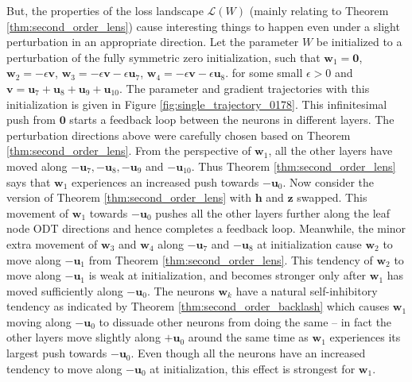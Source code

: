 \documentclass{article}
\theoremstyle{plain}
\theoremstyle{definition}
\theoremstyle{remark}
\newcommand{\1}{{\mathbf 1}}
\newcommand{\0}{{\mathbf 0}}
\newcommand{\h}{{\mathbf h}}
\newcommand{\z}{{\mathbf z}}
\newcommand{\w}{{\mathbf w}}
\newcommand{\bu}{{\mathbf u}}
\newcommand{\bv}{{\mathbf v}}
\renewcommand{\>}{{\rightarrow}}
\begin{document}
But, the properties of the loss landscape $\mathcal{L}(W)$ (mainly relating to Theorem \ref{thm:second_order_lens}) cause interesting things to happen even under a slight perturbation in an appropriate direction. Let the parameter $W$ be initialized to a perturbation of the fully symmetric zero initialization, such that
$\w_1 = \0$, 
$\w_2 =  - \epsilon \bv $,
$\w_3 =  - \epsilon \bv -\epsilon \bu_7$,
$\w_4 =  - \epsilon \bv -\epsilon \bu_8$. 
for some small $\epsilon>0$ and $\bv = \bu_7+\bu_8+\bu_9+\bu_{10}$. The parameter and gradient trajectories with this initialization is given in Figure \ref{fig:single_trajectory_0178}. This infinitesimal push from $\0$ starts a feedback loop between the neurons in different layers. The perturbation directions above were carefully chosen based on Theorem \ref{thm:second_order_lens}. From the perspective of $\w_1$, all the other layers have moved along $-\bu_7, -\bu_8, -\bu_9$ and $-\bu_{10}$. Thus Theorem \ref{thm:second_order_lens} says that $\w_1$ experiences an increased push towards $-\bu_0$. Now consider the version of Theorem \ref{thm:second_order_lens} with $\h$ and $\z$ swapped.  This movement of $\w_1$ towards $-\bu_0$ pushes all the other layers further along the leaf node ODT directions and hence completes a feedback loop. Meanwhile, the minor extra movement of $\w_3$ and $\w_4$ along $-\bu_7$ and $-\bu_8$ at initialization cause $\w_2$ to move along $-\bu_1$ from Theorem \ref{thm:second_order_lens}. This tendency of $\w_2$ to move along $-\bu_1$ is weak at initialization, and becomes stronger only after $\w_1$ has moved sufficiently along $-\bu_0$. The neurons $\w_k$ have a natural self-inhibitory tendency as indicated by Theorem \ref{thm:second_order_backlash} which causes $\w_1$ moving along $-\bu_0$ to dissuade other neurons from doing the same -- in fact the other layers move slightly along $+\bu_0$ around the same time as $\w_1$ experiences its largest push towards $-\bu_0$. Even though all the neurons have an increased tendency to move along $-\bu_0$ at initialization, this effect is strongest for $\w_1$. 

\end{document}
